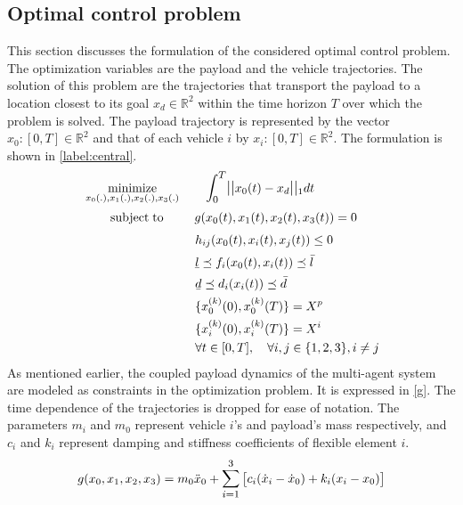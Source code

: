 \documentclass[letterpaper, 10 pt, conference]{ieeeconf}
\newcommand{\ubar}[1]{\text{\b{$#1$}}}
\DeclareMathOperator*{\minimize}{minimize}
\DeclareMathOperator*{\subj}{subject\;to}
\begin{document}
\subsection{Optimal control problem}
This section discusses the formulation of the considered optimal control problem. The optimization variables are the payload and the vehicle trajectories. The solution of this problem are the trajectories that transport the payload to a location closest to its goal $x_d \in \mathbb{R}^2$ within the time horizon $T$ over which the problem is solved.
The payload trajectory is represented by the vector ${x_0:[0,T] \in \mathbb{R}^2}$ and that of each vehicle $i$ by ${x_i:[0,T] \in \mathbb{R}^2}$.
 The formulation is shown in \eqref{label:central}.
\begin{equation}
  \label{label:central}
  \begin{aligned}
    & \minimize_{x_0(.),x_1(.),x_2(.),x_3(.)} \qquad \mathlarger{\int_0^T} \mathlarger{||}x_0(t)-x_d\mathlarger{||}_1 dt \\
    & \qquad \subj
     \qquad \text{  } g(x_0(t),x_1(t),x_2(t),x_3(t)) = 0 \\
    &	\qquad  \qquad \qquad \quad \quad \quad h_{ij}(x_0(t),x_i(t),x_j(t)) \leq 0 \\
    &	\qquad  \qquad \qquad \quad \quad \quad \ubar{l} \preceq f_i(x_0(t),x_i(t)) \preceq \bar{l}\\
    &	\qquad  \qquad \qquad \quad \quad \quad \ubar{d} \preceq d_i(x_i(t)) \preceq \bar{d} \\
    &	\qquad  \qquad \qquad \quad \quad \quad \{x_0^{(k)}(0), x_0^{(k)}(T)\}  = X^p \\
      &	\qquad  \qquad \qquad \quad \quad \quad \{x_i^{(k)}(0), x_i^{(k)}(T)\}  = X^i \\
    &	 \qquad \qquad \qquad \quad \quad \quad \forall t \in [0,T], \quad \forall i,j \in \{1,2,3\}, i \neq j
  \end{aligned}
\end{equation}
As mentioned earlier, the coupled payload dynamics of the multi-agent system are modeled as constraints in the optimization problem. It is expressed in \eqref{g}. The time dependence of the trajectories is dropped for ease of notation. The parameters $m_i$ and $m_0$ represent vehicle $i$'s and payload's mass respectively, and $c_i$ and $k_i$ represent damping and stiffness coefficients of flexible element $i$.
\begin{equation}\label{g}
\begin{aligned}
g(x_0,x_1,x_2,x_3) &= m_0\ddot{x}_0 +  \mathlarger{\sum\limits_{i=1}^{3}}
\begin{bmatrix}{c_i(\dot{x}_i-\dot{x}_0) + k_i(x_i - x_0)} \end{bmatrix}\\
\end{aligned}
\end{equation}
\end{document}
